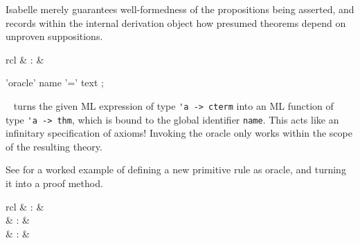 \begin{isabellebody}
\begin{isamarkuptext}
  Isabelle merely guarantees well-formedness of the propositions being
  asserted, and records within the internal derivation object how
  presumed theorems depend on unproven suppositions.

  \begin{matharray}{rcl}
    \hypertarget{command.oracle}{\hyperlink{command.oracle}{\mbox{}}} & : &  \\
  \end{matharray}

  \begin{rail}
    'oracle' name '=' text
    ;
  \end{rail}

  \begin{description}

  \item \hyperlink{command.oracle}{\mbox{}}~ turns the given ML
  expression  of type \verb|'a -> cterm| into an
  ML function of type \verb|'a -> thm|, which is bound to the
  global identifier \verb|name|.  This acts like an infinitary
  specification of axioms!  Invoking the oracle only works within the
  scope of the resulting theory.

  \end{description}

  See \hyperlink{file.~~/src/FOL/ex/Iff-Oracle.thy}{\mbox{}} for a worked example of
  defining a new primitive rule as oracle, and turning it into a proof
  method.%
\end{isamarkuptext}%
\isamarkuptrue%
%
\isamarkuptrue%
%
\begin{isamarkuptext}%
\begin{matharray}{rcl}
    \hypertarget{command.global}{\hyperlink{command.global}{\mbox{}}} & : &  \\
    \hypertarget{command.local}{\hyperlink{command.local}{\mbox{}}} & : &  \\
    \hypertarget{command.hide}{\hyperlink{command.hide}{\mbox{}}} & : &  \\
  \end{matharray}


\end{isamarkuptext}
\end{isabellebody}

